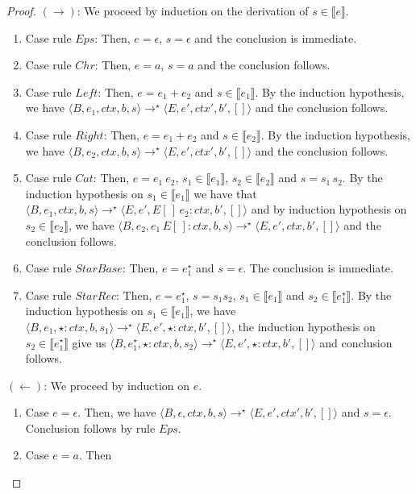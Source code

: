 \documentclass[sigplan]{acmart}
\theoremstyle{definition}
\newcommand{\sembrackets}[1]{\ensuremath{\llbracket #1 \rrbracket}}
\newcommand{\conf}[1]{\ensuremath{\langle #1 \rangle}}
\begin{document}
\begin{proof}
   $(\to)$: We proceed by induction on the derivation of $s\in\sembrackets{e}$.
     \begin{enumerate}
        \item Case rule $Eps$: Then, $e = \epsilon$, $s = \epsilon$ and the conclusion is immediate.
        \item Case rule $Chr$: Then, $e = a$, $s = a$ and the conclusion follows.
        \item Case rule $Left$: Then, $e = e_1 + e_2$ and $s \in\sembrackets{e_1}$. By the induction hypothesis,
              we have $\conf{B,e_1,ctx,b,s}\to^\star\conf{E,e',ctx',b',[]}$ and the conclusion follows.
        \item Case rule $Right$: Then, $e = e_1 + e_2$ and $s \in\sembrackets{e_2}$. By the induction hypothesis,
              we have $\conf{B,e_2,ctx,b,s}\to^\star\conf{E,e',ctx',b',[]}$ and the conclusion follows.
        \item Case rule $Cat$: Then, $e = e_1\:e_2$, $s_1 \in\sembrackets{e_1}$, $s_2\in\sembrackets{e_2}$ and
              $s = s_1\,s_2$. By the induction hypothesis on $s_1 \in\sembrackets{e_1}$ we have that
              $\conf{B,e_1,ctx,b,s}\to^\star\conf{E,e',E[\,]\,e_2 : ctx,b',[]}$ and by
              induction hypothesis on $s_2\in\sembrackets{e_2}$, we have
              $\conf{B,e_2,e_1\,E[\,]:ctx,b,s}\to^\star\conf{E,e',ctx,b',[]}$ and the conclusion follows.
        \item Case rule $StarBase$: Then, $e = e_1^\star$ and $s = \epsilon$. The conclusion is immediate.
        \item Case rule $StarRec$: Then, $e = e_1^\star$, $s = s_1s_2$, $s_1 \in \sembrackets{e_1}$ and
              $s_2\in\sembrackets{e_1^\star}$. By the induction hypothesis on  $s_1 \in \sembrackets{e_1}$, we
              have $\conf{B,e_1,\star : ctx,b,s_1}\to^\star\conf{E,e', \star: ctx,b',[]}$, the induction
              hypothesis on $s_2\in\sembrackets{e_1^\star}$ give us $\conf{B,e_1^\star,\star : ctx,b,s_2}\to^\star\conf{E,e', \star: ctx,b',[]}$
              and conclusion follows.
     \end{enumerate}
  $(\leftarrow)$: We proceed by induction on $e$.
  \begin{enumerate}
     \item Case $e = \epsilon$. Then, we have
      $\conf{B,\epsilon,ctx,b,s}\to^\star\conf{E,e',ctx',b',[]}$ and $s = \epsilon$. Conclusion follows by rule $Eps$.
     \item Case $e = a$. Then

\end{enumerate}
\end{proof}
\end{document}
